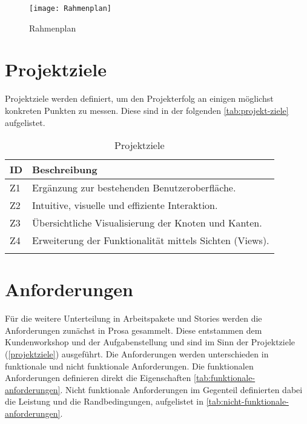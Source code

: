 \begin{landscape}
\begin{figure}[ht]
\centering
\texttt{[image: Rahmenplan]}
\caption{Rahmenplan}
\label{fig:rahmenplan}
\end{figure}
\end{landscape}

\newpage

\section{Projektziele} \label{projektziele}
Projektziele werden definiert, um den Projekterfolg an einigen möglichst konkreten Punkten zu messen. Diese sind in der folgenden \autoref{tab:projekt-ziele} aufgelistet.

\begin{longtable}{|p{1cm}  | p{10.5cm}|}
  \hline
    ID &  Beschreibung \\\hline
    Z1 & Ergänzung zur bestehenden Benutzeroberfläche.\\\hline
    Z2 & Intuitive, visuelle und effiziente Interaktion.\\\hline
    Z3 & Übersichtliche Visualisierung der Knoten und Kanten.\\\hline
    Z4 & Erweiterung der Funktionalität mittels Sichten (Views).\\\hline
    \caption{Projektziele}
  \label{tab:projekt-ziele}
\end{longtable}

\section{Anforderungen}

Für die weitere Unterteilung in Arbeitspakete und Stories werden die Anforderungen zunächst in Prosa gesammelt. Diese entstammen dem Kundenworkshop und der Aufgabenstellung und sind im Sinn der Projektziele (\autoref{projektziele}) ausgeführt. Die Anforderungen werden unterschieden in funktionale und nicht funktionale Anforderungen. Die funktionalen Anforderungen definieren direkt die Eigenschaften \autoref{tab:funktionale-anforderungen}. Nicht funktionale Anforderungen im Gegenteil definierten dabei die Leistung und die Randbedingungen, aufgelistet in \autoref{tab:nicht-funktionale-anforderungen}.

